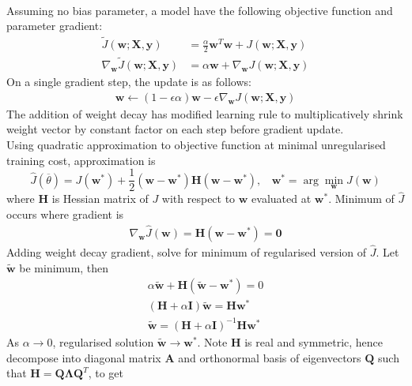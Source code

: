 \begin{remark} \\
Assuming no bias parameter, a model have the following objective function and parameter gradient:
\begin{align}
\tilde{J}(\bm{w}; \bm{X}, \bm{y}) &= \frac{\alpha}{2} \bm{w}^T \bm{w} + J(\bm{w}; \bm{X}, \bm{y}) \nonumber \\
\nabla_{\bm{w}} \tilde{J}(\bm{w}; \bm{X}, \bm{y}) &= \alpha \bm{w} + \nabla_{\bm{w}} J(\bm{w}; \bm{X}, \bm{y}) \nonumber
\end{align}
On a single gradient step, the update is as follows:
\begin{align}
\bm{w} \leftarrow (1 - \epsilon \alpha)\bm{w} - \epsilon \nabla_{\bm{w}} J(\bm{w}; \bm{X}, \bm{y}) \nonumber
\end{align}
The addition of weight decay has modified learning rule to multiplicatively shrink weight vector by constant factor on each step before gradient update.\\
Using quadratic approximation to objective function at minimal unregularised training cost, approximation is
\begin{equation}
\hat{J}(\overline{\theta}) = J(\bm{w}^*) + \frac{1}{2} (\bm{w} - \bm{w}^*)\bm{H}(\bm{w} - \bm{w}^*), \ \ \ \ \bm{w}^* = \arg \min_{\bm{w}} J(\bm{w}) \nonumber
\end{equation}
where $\bm{H}$ is Hessian matrix of $J$ with respect to $\bm{w}$ evaluated at $\bm{w}^*$. Minimum of $\hat{J}$ occurs where gradient is
\begin{align}
\nabla_{\bm{w}} \hat{J}(\bm{w}) = \bm{H}(\bm{w} - \bm{w}^*) = \bm{0} \nonumber
\end{align}
Adding weight decay gradient, solve for minimum of regularised version of $\hat{J}$. Let $\tilde{\bm{w}}$ be minimum, then
\begin{align}
\alpha \tilde{\bm{w}} + \bm{H}(\tilde{\bm{w}} - \bm{w}^*) = 0 \nonumber \\
(\bm{H} + \alpha \bm{I})\tilde{\bm{w}} = \bm{H} \bm{w}^* \nonumber \\
\tilde{\bm{w}} = (\bm{H} + \alpha \bm{I})^{-1} \bm{H} \bm{w}^* \nonumber
\end{align}
As $\alpha \rightarrow 0$, regularised solution $\tilde{\bm{w}} \rightarrow \bm{w}^*$. Note $\bm{H}$ is real and symmetric, hence decompose into diagonal matrix $\bm{A}$ and orthonormal basis of eigenvectors $\bm{Q}$ such that $\bm{H} = \bm{Q} \bm{\Lambda} \bm{Q}^T$, to get
\begin{equation}

\end{equation}
\end{remark}
